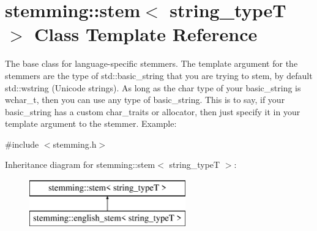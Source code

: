 \hypertarget{classstemming_1_1stem}{\section{stemming\-:\-:stem$<$ string\-\_\-type\-T $>$ Class Template Reference}
\label{classstemming_1_1stem}
}


The base class for language-\/specific stemmers. The template argument for the stemmers are the type of std\-::basic\-\_\-string that you are trying to stem, by default std\-::wstring (Unicode strings). As long as the char type of your basic\-\_\-string is wchar\-\_\-t, then you can use any type of basic\-\_\-string. This is to say, if your basic\-\_\-string has a custom char\-\_\-traits or allocator, then just specify it in your template argument to the stemmer. Example\-:  




{\ttfamily \#include $<$stemming.\-h$>$}

Inheritance diagram for stemming\-:\-:stem$<$ string\-\_\-type\-T $>$\-:\begin{figure}[H]
\begin{center}
\leavevmode
\includegraphics[height=2.000000cm]{classstemming_1_1stem}
\end{center}
\end{figure}
